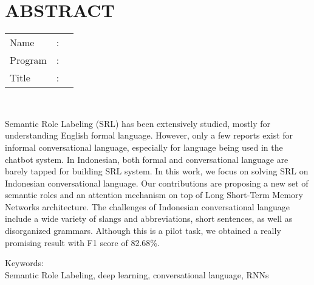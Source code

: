 %
%
%

\chapter*{ABSTRACT}

\vspace*{0.2cm}

\noindent \begin{tabular}{l l p{11.0cm}}
	Name&: & \penulis \\
	Program&: & \programEng \\
	Title&: & \judulInggris \\
\end{tabular} \\ 

\vspace*{0.5cm}

\noindent 

Semantic Role Labeling (SRL) has been extensively studied, mostly for understanding English formal language. However, only a few reports exist for informal conversational language, especially for language being used in the chatbot system. In Indonesian, both formal and conversational language are barely tapped for building SRL system. In this work, we focus on solving SRL on Indonesian conversational language. Our contributions are proposing a new set of semantic roles and an attention mechanism on top of Long Short-Term Memory Networks architecture. The challenges of Indonesian conversational language include a wide variety of slangs and abbreviations, short sentences, as well as disorganized grammars. Although this is a pilot task, we obtained a really promising result with F1 score of 82.68\%.

\vspace*{0.2cm}

\noindent Keywords: \\ 
\noindent Semantic Role Labeling, deep learning, conversational language, RNNs \\ 

\newpage